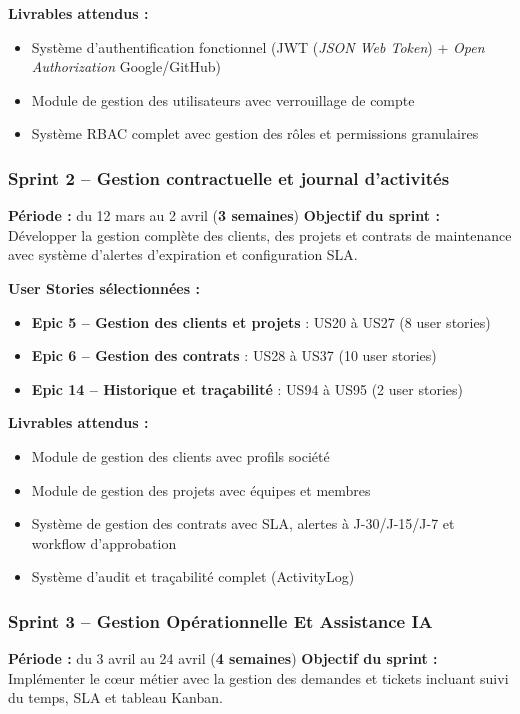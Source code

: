 \noindent\textbf{Livrables attendus :}
\begin{itemize}[nosep,leftmargin=1.6cm,topsep=0pt,itemsep=2pt,label=$\bullet$]
  \item Système d'authentification fonctionnel (JWT (\textit{JSON Web Token}) + \textit{Open Authorization} Google/GitHub)
  \item Module de gestion des utilisateurs avec verrouillage de compte
  \item Système RBAC complet avec gestion des rôles et permissions granulaires
\end{itemize}

\subsubsection{Sprint 2 -- Gestion contractuelle et journal d'activités}
\textbf{Période :} du 12 mars au 2 avril (\textbf{3 semaines})
\newline
\textbf{Objectif du sprint :} Développer la gestion complète des clients, des projets et contrats
de maintenance avec système d'alertes d'expiration et configuration SLA.

\noindent
\textbf{User Stories sélectionnées :}
\begin{itemize}[nosep,leftmargin=1.6cm,topsep=0pt,itemsep=2pt,label=$\bullet$]
  \item \textbf{Epic 5 -- Gestion des clients et projets} : US20 à US27 (8 user stories)
  \item \textbf{Epic 6 -- Gestion des contrats} : US28 à US37 (10 user stories)
  \item \textbf{Epic 14 -- Historique et traçabilité} : US94 à US95 (2 user stories)
\end{itemize}

\noindent\textbf{Livrables attendus :}
\begin{itemize}[nosep,leftmargin=1.6cm,topsep=0pt,itemsep=2pt,label=$\bullet$]
  \item Module de gestion des clients avec profils société
  \item Module de gestion des projets avec équipes et membres
  \item Système de gestion des contrats avec SLA, alertes à J-30/J-15/J-7 et
    workflow d'approbation
  \item Système d'audit et traçabilité complet (ActivityLog)
\end{itemize}

\subsubsection{Sprint 3 -- Gestion Opérationnelle Et Assistance IA}
\textbf{Période :} du 3 avril au 24 avril (\textbf{4 semaines})
\newline
\textbf{Objectif du sprint :} Implémenter le cœur métier avec la gestion des
demandes et tickets incluant suivi du temps, SLA et tableau Kanban.


